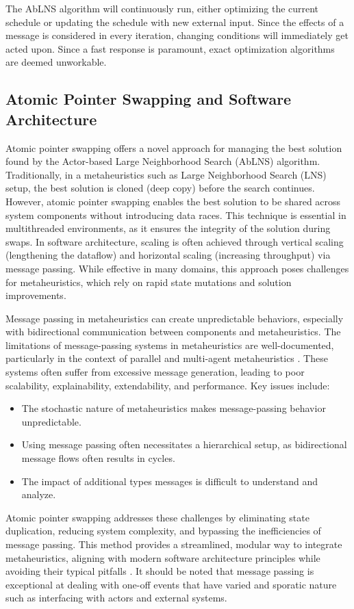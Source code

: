 The AbLNS algorithm will continuously run, either optimizing the current
schedule or updating the schedule with new external input. Since the
effects of a message is considered in every iteration, changing conditions
will immediately get acted upon. Since a fast response is paramount, exact
optimization algorithms are deemed unworkable.

\subsection{Atomic Pointer Swapping and Software Architecture}
Atomic pointer swapping offers a novel approach for managing the best
solution found by the Actor-based Large Neighborhood Search (AbLNS) algorithm.
Traditionally, in a metaheuristics such as Large Neighborhood Search (LNS)
setup, the best solution is cloned (deep copy) before the search continues. However, atomic
pointer swapping enables the best solution to be shared across system components
without introducing data races. This technique is essential in multithreaded
environments, as it ensures the integrity of the solution during swaps. In
software architecture, scaling is often achieved through vertical scaling
(lengthening the dataflow) and horizontal scaling (increasing throughput)
via message passing. While effective in many domains, this approach poses
challenges for metaheuristics, which rely on rapid state mutations and solution
improvements.

Message passing in metaheuristics can create unpredictable behaviors, especially
with bidirectional communication between components and metaheuristics. The
limitations of message-passing systems in metaheuristics are well-documented,
particularly in the context of parallel and multi-agent metaheuristics
\citep{talbiMetaheuristicsDesignImplementation2009}. These systems often suffer
from excessive message generation, leading to poor scalability, explainability,
extendability, and performance. Key issues include:

\begin{itemize} 
	\item The stochastic nature
		of metaheuristics makes message-passing behavior unpredictable. 
	\item Using message passing often necessitates a
		hierarchical setup, as bidirectional message flows often results in cycles. 
	\item The
		impact of additional types messages is difficult to understand and analyze. 
\end{itemize}

Atomic pointer swapping addresses these challenges by eliminating state
duplication, reducing system complexity, and bypassing the inefficiencies of
message passing. This method provides a streamlined, modular way to integrate
metaheuristics, aligning with modern software architecture principles while
avoiding their typical pitfalls \citep{richards_fundamentals_2020}. It should
be noted that message passing is exceptional at dealing with one-off events that
have varied and sporatic nature such as interfacing with actors and external
systems.

